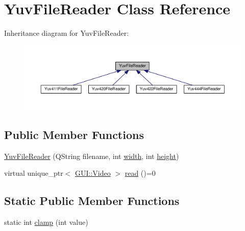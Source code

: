 \hypertarget{classUtility_1_1YuvFileReader}{}\section{Yuv\+File\+Reader Class Reference}
\label{classUtility_1_1YuvFileReader}


Inheritance diagram for Yuv\+File\+Reader\+:
\nopagebreak
\begin{figure}[H]
\begin{center}
\leavevmode
\includegraphics[width=350pt]{classUtility_1_1YuvFileReader__inherit__graph}
\end{center}
\end{figure}
\subsection*{Public Member Functions}
\begin{DoxyCompactItemize}
\item 
\hyperlink{classUtility_1_1YuvFileReader_a4d1117a96eef85d154a837df5779e21a}{Yuv\+File\+Reader} (Q\+String filename, int \hyperlink{classUtility_1_1YuvFileReader_a2474a5474cbff19523a51eb1de01cda4}{width}, int \hyperlink{classUtility_1_1YuvFileReader_ad12fc34ce789bce6c8a05d8a17138534}{height})
\item 
virtual unique\+\_\+ptr$<$ \hyperlink{classGUI_1_1Video}{G\+U\+I\+::\+Video} $>$ \hyperlink{classUtility_1_1YuvFileReader_a9f6febb7a2fd1e1313f41c516d989bd1}{read} ()=0
\end{DoxyCompactItemize}
\subsection*{Static Public Member Functions}
\begin{DoxyCompactItemize}
\item 
static int \hyperlink{classUtility_1_1YuvFileReader_ae73346d00388350396fd2185ca80dfb8}{clamp} (int value)
\end{DoxyCompactItemize}
